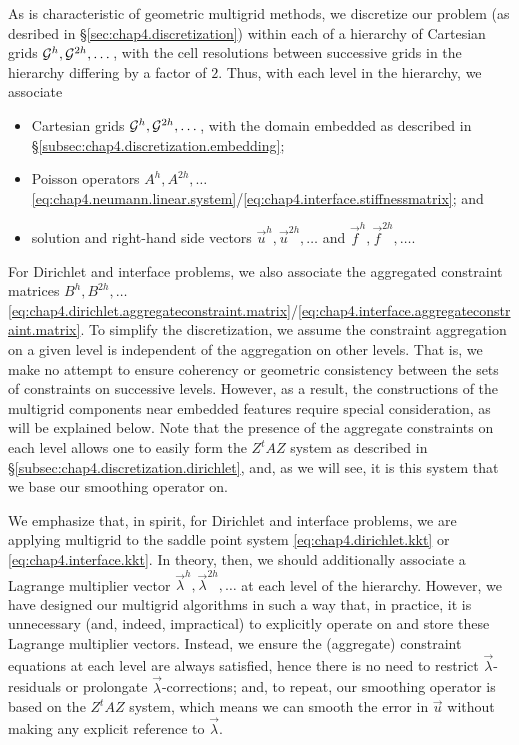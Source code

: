 As is characteristic of geometric multigrid methods, we discretize our problem (as desribed in \S\ref{sec:chap4.discretization}) within each of a hierarchy of Cartesian grids $\mathcal{G}^h, \mathcal{G}^{2h}, \dotsc$, with the cell resolutions between successive grids in the hierarchy differing by a factor of $2$. Thus, with each level in the hierarchy, we associate
\begin{itemize}
\item Cartesian grids $\mathcal{G}^h, \mathcal{G}^{2h}, \dotsc$, with the domain embedded as described in \S\ref{subsec:chap4.discretization.embedding};
\item Poisson operators $A^h, A^{2h}, \dotsc$ \eqref{eq:chap4.neumann.linear.system}/\eqref{eq:chap4.interface.stiffnessmatrix}; and
\item solution and right-hand side vectors $\vec{u}^h, \vec{u}^{2h}, \dotsc$ and $\vec{f}^h, \vec{f}^{2h}, \dotsc$.
\end{itemize}
For Dirichlet and interface problems, we also associate the aggregated constraint matrices $B^h, B^{2h}, \dotsc$ \eqref{eq:chap4.dirichlet.aggregateconstraint.matrix}/\eqref{eq:chap4.interface.aggregateconstraint.matrix}. To simplify the discretization, we assume the constraint aggregation on a given level is independent of the aggregation on other levels. That is, we make no attempt to ensure coherency or geometric consistency between the sets of constraints on successive levels. However, as a result, the constructions of the multigrid components near embedded features require special consideration, as will be explained below. Note that the presence of the aggregate constraints on each level allows one to easily form the $Z^tAZ$ system as described in \S\ref{subsec:chap4.discretization.dirichlet}, and, as we will see, it is this system that we base our smoothing operator on.

We emphasize that, in spirit, for Dirichlet and interface problems, we are applying multigrid to the saddle point system \eqref{eq:chap4.dirichlet.kkt} or \eqref{eq:chap4.interface.kkt}. In theory, then, we should additionally associate a Lagrange multiplier vector $\vec{\lambda}^h, \vec{\lambda}^{2h}, \dotsc$ at each level of the hierarchy. However, we have designed our multigrid algorithms in such a way that, in practice, it is unnecessary (and, indeed, impractical) to explicitly operate on and store these Lagrange multiplier vectors. Instead, we ensure the (aggregate) constraint equations at each level are always satisfied, hence there is no need to restrict $\vec{\lambda}$-residuals or prolongate $\vec{\lambda}$-corrections; and, to repeat, our smoothing operator is based on the $Z^tAZ$ system, which means we can smooth the error in $\vec{u}$ without making any explicit reference to $\vec{\lambda}$.

